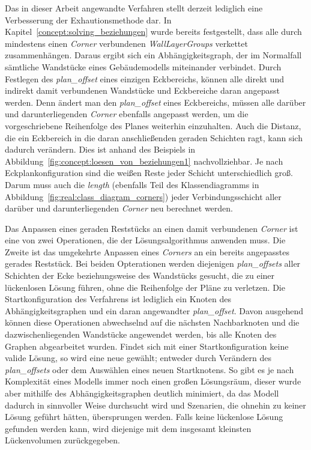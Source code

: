 Das in dieser Arbeit angewandte Verfahren stellt derzeit lediglich eine Verbesserung der Exhautionsmethode dar.
In Kapitel~\ref{concept:solving_beziehungen} wurde bereits festgestellt, dass alle durch mindestens einen \textit{Corner} verbundenen \textit{WallLayerGroups} verkettet zusammenhängen.
Daraus ergibt sich ein Abhängigkeitsgraph, der im Normalfall sämtliche Wandstücke eines Gebäudemodells miteinander verbindet.
Durch Festlegen des \textit{plan\_offset} eines einzigen Eckbereichs, können alle direkt und indirekt damit verbundenen Wandstücke und Eckbereiche daran angepasst werden.
Denn ändert man den \textit{plan\_offset} eines Eckbereichs, müssen alle darüber und darunterliegenden \textit{Corner} ebenfalls angepasst werden, um die vorgeschriebene Reihenfolge des Planes weiterhin einzuhalten.
Auch die Distanz, die ein Eckbereich in die daran anschließenden geraden Schichten ragt, kann sich dadurch verändern.
Dies ist anhand des Beispiels in Abbildung~\ref{fig:concept:loesen_von_beziehungen1} nachvollziehbar.
Je nach Eckplankonfiguration sind die weißen Reste jeder Schicht unterschiedlich groß.
Darum muss auch die \textit{length} (ebenfalls Teil des Klassendiagramms in Abbildung~\ref{fig:real:class_diagram_corners}) jeder Verbindungsschicht aller darüber und darunterliegenden \textit{Corner} neu berechnet werden.

Das Anpassen eines geraden Reststücks an einen damit verbundenen \textit{Corner} ist eine von zwei Operationen, die der Lösungsalgorithmus anwenden muss.
Die Zweite ist das umgekehrte Anpassen eines \textit{Corners} an ein bereits angepasstes gerades Reststück.
Bei beiden Opterationen werden diejenigen \textit{plan\_offsets} aller Schichten der Ecke beziehungsweise des Wandstücks gesucht, die zu einer lückenlosen Lösung führen, ohne die Reihenfolge der Pläne zu verletzen.
Die Startkonfiguration des Verfahrens ist lediglich ein Knoten des Abhängigkeitsgraphen und ein daran angewandter \textit{plan\_offset}.
Davon ausgehend können diese Operationen abwechselnd auf die nächsten Nachbarknoten und die dazwischenliegenden Wandstücke angewendet werden, bis alle Knoten des Graphen abgearbeitet wurden.
Findet sich mit einer Startkonfiguration keine valide Lösung, so wird eine neue gewählt; entweder durch Verändern des \textit{plan\_offsets} oder dem Auswählen eines neuen Startknotens.
So gibt es je nach Komplexität eines Modells immer noch einen großen Lösungsräum, dieser wurde aber mithilfe des Abhängigkeitsgraphen deutlich minimiert, da das Modell dadurch in sinnvoller Weise durchsucht wird und Szenarien, die ohnehin zu keiner Lösung geführt hätten, übersprungen werden.
Falls keine lückenlose Lösung gefunden werden kann, wird diejenige mit dem insgesamt kleinsten Lückenvolumen zurückgegeben.


